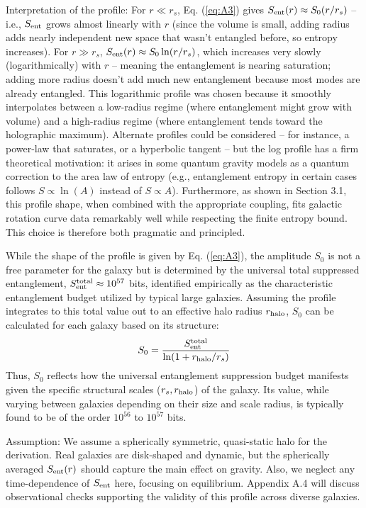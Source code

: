 \documentclass[11pt]{article}
\begin{document}
Interpretation of the profile: For $r \ll r_s$, Eq. (\ref{eq:A3}) gives $S_{\rm ent}(r) \approx S_0(r/r_s)$ – i.e., $S_{\rm ent}$ grows almost linearly with $r$ (since the volume is small, adding radius adds nearly independent new space that wasn’t entangled before, so entropy increases). For $r \gg r_s$, $S_{\rm ent}(r) \approx S_0 \ln(r/r_s)$, which increases very slowly (logarithmically) with $r$ – meaning the entanglement is nearing saturation; adding more radius doesn’t add much new entanglement because most modes are already entangled. This logarithmic profile was chosen because it smoothly interpolates between a low-radius regime (where entanglement might grow with volume) and a high-radius regime (where entanglement tends toward the holographic maximum). Alternate profiles could be considered – for instance, a power-law that saturates, or a hyperbolic tangent – but the log profile has a firm theoretical motivation: it arises in some quantum gravity models as a quantum correction to the area law of entropy (e.g., entanglement entropy in certain cases follows $S \propto \ln(A)$ instead of $S \propto A$). Furthermore, as shown in Section 3.1, this profile shape, when combined with the appropriate coupling, fits galactic rotation curve data remarkably well while respecting the finite entropy bound. This choice is therefore both pragmatic and principled.  

While the shape of the profile is given by Eq. (\ref{eq:A3}), the amplitude $S_0$ is not a free parameter for the galaxy but is determined by the universal total suppressed entanglement, $S_{\rm ent}^{\rm total} \approx 10^{57}$ bits, identified empirically as the characteristic entanglement budget utilized by typical large galaxies. Assuming the profile integrates to this total value out to an effective halo radius $r_{\rm halo}$, $S_0$ can be calculated for each galaxy based on its structure:
\begin{equation*}
S_0 = \frac{S_{\rm ent}^{\rm total}}{\ln(1+r_{\rm halo}/r_s)} 
\end{equation*}
Thus, $S_0$ reflects how the universal entanglement suppression budget manifests given the specific structural scales ($r_s, r_{\rm halo}$) of the galaxy. Its value, while varying between galaxies depending on their size and scale radius, is typically found to be of the order $10^{56}$ to $10^{57}$ bits.  

Assumption: We assume a spherically symmetric, quasi-static halo for the derivation. Real galaxies are disk-shaped and dynamic, but the spherically averaged $S_{\rm ent}(r)$ should capture the main effect on gravity. Also, we neglect any time-dependence of $S_{\rm ent}$ here, focusing on equilibrium. Appendix A.4 will discuss observational checks supporting the validity of this profile across diverse galaxies.
\end{document}
